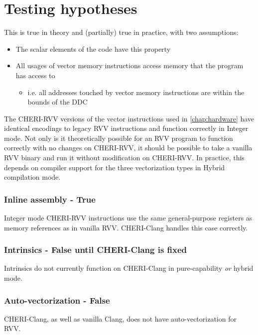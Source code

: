 \section{Testing hypotheses}\label{chap:software:sec:hypotheses}


This is true in theory and (partially) true in practice, with two assumptions:
\begin{itemize}
    \item The scalar elements of the code have this property
    \item All usages of vector memory instructions access memory that the program has access to
    \begin{itemize}
        \item i.e. all addresses touched by vector memory instructions are within the bounds of the DDC
    \end{itemize}
\end{itemize}

The CHERI-RVV versions of the vector instructions used in \cref{chap:hardware} have identical encodings to legacy RVV instructions and function correctly in Integer mode.
Not only is it theoretically possible for an RVV program to function correctly with no changes on CHERI-RVV, it should be possible to take a vanilla RVV binary and run it without modification on CHERI-RVV.
In practice, this depends on compiler support for the three vectorization types in Hybrid compilation mode.

\subsubsection*{Inline assembly - True}
Integer mode CHERI-RVV instructions use the same general-purpose registers as memory references as in vanilla RVV.
CHERI-Clang handles this case correctly.

\subsubsection*{Intrinsics - False until CHERI-Clang is fixed}
Intrinsics do not currently function on CHERI-Clang in pure-capability \emph{or} hybrid mode.

\subsubsection*{Auto-vectorization - False}
CHERI-Clang, as well as vanilla Clang, does not have auto-vectorization for RVV.

